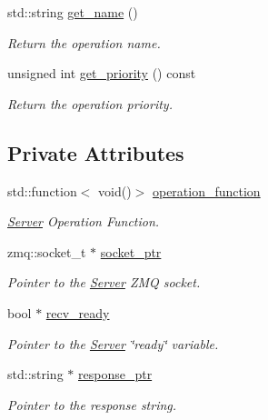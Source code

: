 \begin{DoxyCompactItemize}
std\-::string \hyperlink{classzcm_1_1Base__Operation_a46b6a3f23e18bc35425ec2dab80c849f}{get\-\_\-name} ()
\begin{DoxyCompactList}\small\item\em Return the operation name. \end{DoxyCompactList}\item 
unsigned int \hyperlink{classzcm_1_1Base__Operation_a3b15b35c31ed173d2abb193e9fba32ef}{get\-\_\-priority} () const 
\begin{DoxyCompactList}\small\item\em Return the operation priority. \end{DoxyCompactList}\end{DoxyCompactItemize}
\subsection*{Private Attributes}
\begin{DoxyCompactItemize}
\item 
std\-::function$<$ void()$>$ \hyperlink{classzcm_1_1Server__Operation_af6df162db0b1f42248b52c8925dcc64d}{operation\-\_\-function}
\begin{DoxyCompactList}\small\item\em \hyperlink{classzcm_1_1Server}{Server} Operation Function. \end{DoxyCompactList}\item 
zmq\-::socket\-\_\-t $\ast$ \hyperlink{classzcm_1_1Server__Operation_a07efad79c512d03a54fe2bb99166d52f}{socket\-\_\-ptr}
\begin{DoxyCompactList}\small\item\em Pointer to the \hyperlink{classzcm_1_1Server}{Server} Z\-M\-Q socket. \end{DoxyCompactList}\item 
bool $\ast$ \hyperlink{classzcm_1_1Server__Operation_a2b71778be842aedf6d122b531e186ca8}{recv\-\_\-ready}
\begin{DoxyCompactList}\small\item\em Pointer to the \hyperlink{classzcm_1_1Server}{Server} \char`\"{}ready\char`\"{} variable. \end{DoxyCompactList}\item 
std\-::string $\ast$ \hyperlink{classzcm_1_1Server__Operation_add538216fe0c56f8edd74c12d9b5f224}{response\-\_\-ptr}
\begin{DoxyCompactList}\small\item\em Pointer to the response string. \end{DoxyCompactList}\end{DoxyCompactItemize}


